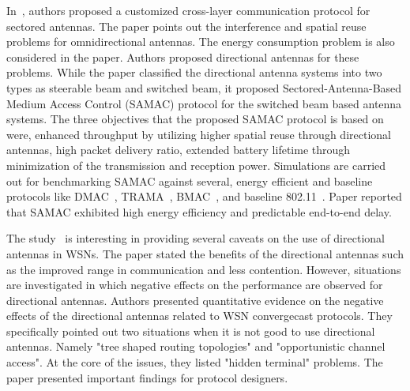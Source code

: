 \documentclass[12pt, oneandhalf, chaparabic, sees, ms]{metu}
\begin{document}
In~\cite{felemban2010}, authors proposed a customized cross-layer communication protocol
for sectored antennas. The paper points out the interference and spatial reuse problems for omnidirectional antennas. The energy consumption problem
is also considered in the paper. Authors proposed directional antennas for these problems. While the paper classified the directional antenna systems 
into two types as steerable beam and switched beam, it proposed Sectored-Antenna-Based Medium Access Control (SAMAC) 
protocol for the switched beam based antenna systems.
The three objectives that the proposed SAMAC protocol is based on were, enhanced throughput by utilizing higher spatial reuse through directional antennas,
high packet delivery ratio, extended battery lifetime through minimization of the transmission and reception power.
Simulations are carried out for benchmarking SAMAC against several, energy efficient and baseline protocols 
like DMAC~\cite{korakis2003}, TRAMA~\cite{rajendran2006}, 
BMAC~\cite{polastre2004}, and baseline 802.11~\cite{ieee802}.
Paper reported that SAMAC exhibited high energy efficiency and predictable end-to-end delay.

The study~\cite{tarter2016} is interesting in providing several caveats on the use of directional antennas in WSNs. 
The paper stated the benefits of the directional antennas such as the improved range in communication and less contention. 
However, situations are investigated in which negative effects on the performance are observed for directional antennas.
Authors presented quantitative evidence on the negative effects of the directional antennas related to WSN convergecast protocols.
They specifically pointed out two situations when it is not good to use directional antennas. Namely "tree shaped routing topologies" and "opportunistic channel access".
At the core of the issues, they listed "hidden terminal" problems. The paper presented important findings for protocol designers.






% 
\end{document}

